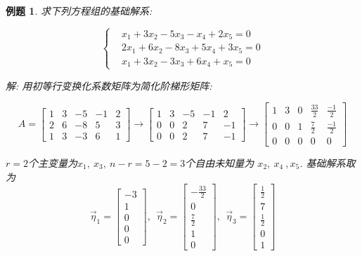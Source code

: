 \documentclass[a4paper]{book}
\newtheorem{eg}{例题}[chapter]
\begin{document}
\begin{eg}
求下列方程组的基础解系:

\begin{displaymath}\left\{\begin{aligned}
&x_1+3x_2-5x_3-x_4+2x_5=0\\
&2x_1+6x_2-8x_3+5x_4+3x_5=0\\
&x_1+3x_2-3x_3+6x_4+x_5=0
\end{aligned}\right.\end{displaymath}

解: 用初等行变换化系数矩阵为简化阶梯形矩阵:

\begin{displaymath}
A=\begin{bmatrix}1&3&-5&-1&2\\2&6&-8&5&3\\1&3&-3&6&1\end{bmatrix}\rightarrow
\begin{bmatrix}1&3&-5&-1&2\\0&0&2&7&-1\\0&0&2&7&-1\end{bmatrix}\rightarrow
\begin{bmatrix}1&3&0&\frac{33}{2}&\frac{-1}{2}\\0&0&1&\frac{7}{2}&\frac{-1}{2}\\
0&0&0&0&0\end{bmatrix}\end{displaymath}

$r=2$个主变量为$x_1,\ x_3,\ n-r = 5-2 = 3$个自由未知量为 $x_2,\ x_4\ , x_5$. 基础解系取为
\begin{displaymath}\vec{\eta}_1=\begin{bmatrix}-3\\1\\0\\0\\0\end{bmatrix},\ \ \vec{\eta}_2=\begin{bmatrix}-\frac{33}{2}\\0\\ \frac{7}{2}\\1\\0\end{bmatrix},\ \ \vec{\eta}_3=\begin{bmatrix}\frac{1}{2}\\7\\ \frac{1}{2}\\0\\1\end{bmatrix}\end{displaymath}


\end{eg}
\end{document}
